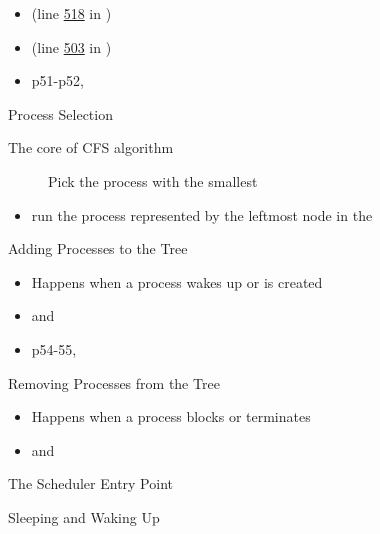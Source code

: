 \begin{itemize}
\item {} (line
  \href{http://lxr.linux.no/linux+v2.6.34/kernel/sched_fair.c#L518}{518} in
  ) 
\item {} (line
  \href{http://lxr.linux.no/linux+v2.6.34/kernel/sched_fair.c#L503}{503} in
  ) 
\item p51-p52, \cite{love2010linux}
\end{itemize}

\begin{frame}{Process Selection}
  \begin{description}
  \item[The core of CFS algorithm] Pick the process with the smallest 
  \end{description}
  \begin{itemize}
  \item run the process represented by the leftmost node in the 
  \end{itemize}
  \begin{center}
     
  \end{center}
\end{frame}

\begin{frame}{Adding Processes to the Tree}
  \begin{itemize}
  \item Happens when a process wakes up or is created
  \item {} and 
  \end{itemize}
\end{frame}

\begin{itemize}
\item p54-55, \cite{love2010linux}
\end{itemize}

\begin{frame}{Removing Processes from the Tree}
  \begin{itemize}
  \item Happens when a process blocks or terminates
  \item {} and 
  \end{itemize}
\end{frame}

\begin{frame}{The Scheduler Entry Point}
  
\end{frame}

\begin{frame}{Sleeping and Waking Up}
  
\end{frame}


